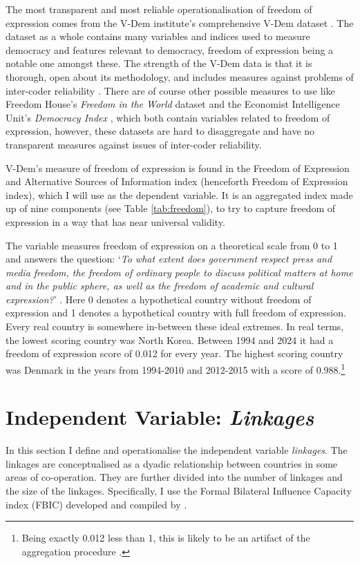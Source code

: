 The most transparent and most reliable operationalisation of freedom of expression comes from the V-Dem institute's comprehensive V-Dem dataset \citep{coppedge_v-dem_2025}. The dataset as a whole contains many variables and indices used to measure democracy and features relevant to democracy, freedom of expression being a notable one amongst these. The strength of the V-Dem data is that it is thorough, open about its methodology, and includes measures against problems of inter-coder reliability \citep{coppedge_v-dem_2024-2}. There are of course other possible measures to use like Freedom House's \textit{Freedom in the World} dataset \citep{freedom_house_freedom_2024} and the Economist Intelligence Unit's \textit{Democracy Index} \citep{economist_intelligence_unit_democracy_2024}, which both contain variables related to freedom of expression, however, these datasets are hard to disaggregate and have no transparent measures against issues of inter-coder reliability.

V-Dem's measure of freedom of expression is found in the Freedom of Expression and Alternative Sources of Information index (henceforth Freedom of Expression index), which I will use as the dependent variable. It is an aggregated index made up of nine components (see Table \ref{tab:freedom}), to try to capture freedom of expression in a way that has near universal validity. 

The variable measures freedom of expression on a theoretical scale from 0 to 1 and answers the question: `\textit{To what extent does government respect press and media freedom, the freedom of ordinary people to discuss political matters at home and in the public sphere, as well as the freedom of academic and cultural expression?}' \citep[pp. 50-51]{coppedge_v-dem_2024-1}. Here 0 denotes a hypothetical country without freedom of expression and 1 denotes a hypothetical country with full freedom of expression. Every real country is somewhere in-between these ideal extremes. In  real terms, the lowest scoring country was North Korea. Between 1994 and 2024 it had a freedom of expression score of 0.012 for every year. The highest scoring country was Denmark in the years from 1994-2010 and 2012-2015 with a score of 0.988.\footnote{Being exactly 0.012 less than 1, this is likely to be an artifact of the aggregation procedure \citep{coppedge_v-dem_2024-2}.}

\section{Independent Variable: \textit{Linkages}}
In this section I define and operationalise the independent variable \textit{linkages}. The linkages are conceptualised as a dyadic relationship between countries in some areas of co-operation. They are further divided into the number of linkages and the size of the linkages. Specifically, I use the Formal Bilateral Influence Capacity index (FBIC) developed and compiled by \citet{moyer_china-us_2021}.

